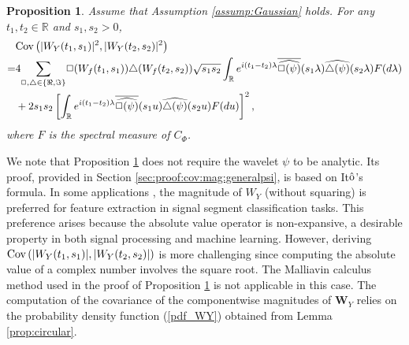 \documentclass{amsart}
\newtheorem{Proposition}{Proposition}
\begin{document}
\begin{Proposition}\label{cov:mag:generalpsi}
Assume that Assumption \ref{assump:Gaussian} holds.
For any $t_{1},t_{2}\in \mathbb{R}$ and $s_{1},s_{2}>0$,
\begin{align}\notag
&\textup{Cov}\left(|W_{Y}(t_{1},s_{1})|^2, |W_{Y}(t_{2},s_{2})|^2\right)
\\\notag=&4\underset{\Box,\triangle \in \{\Re,\Im\}}{\sum} \Box(W_{f}(t_{1},s_{1}))\triangle(W_{f}(t_{2},s_{2}))
\sqrt{s_{1}s_{2}}\int_{\mathbb{R}}e^{i(t_{1}-t_{2})\lambda} \overline{\widehat{\Box(\psi)}}(s_{1}\lambda)\widehat{\triangle(\psi)}(s_{2}\lambda)F(d\lambda)
\\\notag&+2s_{1}s_{2}\left[\int_{\mathbb{R}}e^{i(t_{1}-t_{2})\lambda} \overline{\widehat{\Box(\psi)}}(s_{1}u)
\widehat{\triangle(\psi)}(s_{2}u)F(du)\right]^{2},
\end{align}
where $F$ is the spectral measure of $C_{\Phi}$.
\end{Proposition}
We note that  Proposition \ref{cov:mag:generalpsi} does not require the wavelet $\psi$ to be analytic.
Its proof, provided in Section \ref{sec:proof:cov:mag:generalpsi}, is based on It$\hat{\textup{o}}$'s formula.
In some applications \cite{anden2014deep,mallat2012group}, the magnitude of $W_{Y}$ (without squaring) is preferred for feature extraction in signal segment classification tasks. This preference arises because the absolute value operator is non-expansive, a desirable property in both signal processing and machine learning.
However, deriving
$\textup{Cov}\left(|W_{Y}(t_{1},s_{1})|, |W_{Y}(t_{2},s_{2})|\right)$ is more challenging since computing the absolute value of a complex number involves the square root. The Malliavin calculus method used in the proof of Proposition \ref{cov:mag:generalpsi} is not applicable in this case.
The computation of the covariance of the componentwise magnitudes of $\mathbf{W}_{Y}$ relies on the probability density function (\ref{pdf_WY}) obtained from Lemma \ref{prop:circular}.
\end{document}
